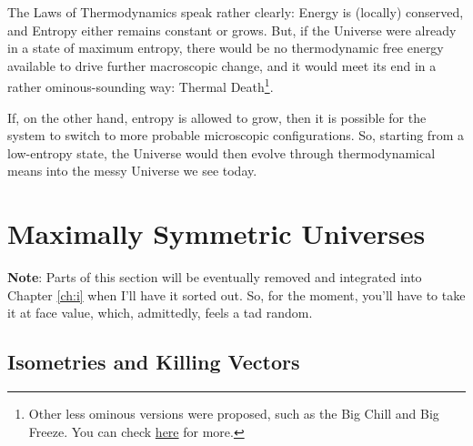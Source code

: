 The Laws of Thermodynamics speak rather clearly: Energy is (locally) conserved, and Entropy either remains constant or grows. But, if the Universe were already in a state of maximum entropy, there would be no thermodynamic free energy available to drive further macroscopic change, and it would meet its end in a rather ominous-sounding way: Thermal Death\footnote{Other less ominous versions were proposed, such as the Big Chill and Big Freeze. You can check \href{https://en.wikipedia.org/wiki/Heat_death_of_the_universe}{here} for more.}.
\par If, on the other hand, entropy is allowed to grow, then it is possible for the system to switch to more probable microscopic configurations. So, starting from a low-entropy state, the Universe would then evolve through thermodynamical means into the messy Universe we see today.

\section{Maximally Symmetric Universes}

\textbf{Note}: Parts of this section will be eventually removed and integrated into Chapter \ref{ch:i} when I'll have it sorted out. So, for the moment, you'll have to take it at face value, which, admittedly, feels a tad random.

\subsection{Isometries and Killing Vectors}


